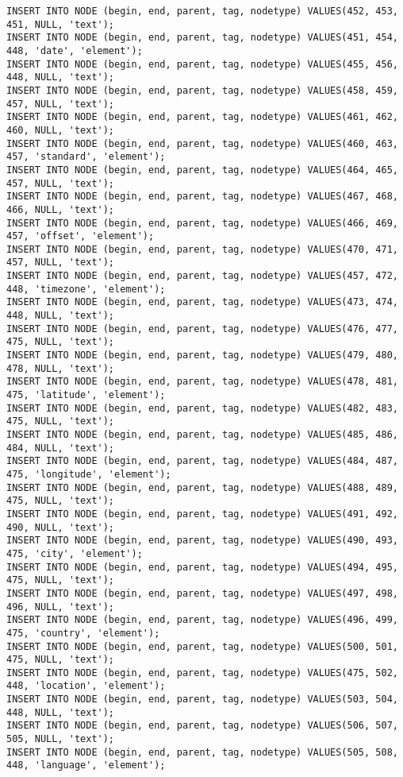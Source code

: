 \begin{verbatim}
INSERT INTO NODE (begin, end, parent, tag, nodetype) VALUES(452, 453, 451, NULL, 'text');
INSERT INTO NODE (begin, end, parent, tag, nodetype) VALUES(451, 454, 448, 'date', 'element');
INSERT INTO NODE (begin, end, parent, tag, nodetype) VALUES(455, 456, 448, NULL, 'text');
INSERT INTO NODE (begin, end, parent, tag, nodetype) VALUES(458, 459, 457, NULL, 'text');
INSERT INTO NODE (begin, end, parent, tag, nodetype) VALUES(461, 462, 460, NULL, 'text');
INSERT INTO NODE (begin, end, parent, tag, nodetype) VALUES(460, 463, 457, 'standard', 'element');
INSERT INTO NODE (begin, end, parent, tag, nodetype) VALUES(464, 465, 457, NULL, 'text');
INSERT INTO NODE (begin, end, parent, tag, nodetype) VALUES(467, 468, 466, NULL, 'text');
INSERT INTO NODE (begin, end, parent, tag, nodetype) VALUES(466, 469, 457, 'offset', 'element');
INSERT INTO NODE (begin, end, parent, tag, nodetype) VALUES(470, 471, 457, NULL, 'text');
INSERT INTO NODE (begin, end, parent, tag, nodetype) VALUES(457, 472, 448, 'timezone', 'element');
INSERT INTO NODE (begin, end, parent, tag, nodetype) VALUES(473, 474, 448, NULL, 'text');
INSERT INTO NODE (begin, end, parent, tag, nodetype) VALUES(476, 477, 475, NULL, 'text');
INSERT INTO NODE (begin, end, parent, tag, nodetype) VALUES(479, 480, 478, NULL, 'text');
INSERT INTO NODE (begin, end, parent, tag, nodetype) VALUES(478, 481, 475, 'latitude', 'element');
INSERT INTO NODE (begin, end, parent, tag, nodetype) VALUES(482, 483, 475, NULL, 'text');
INSERT INTO NODE (begin, end, parent, tag, nodetype) VALUES(485, 486, 484, NULL, 'text');
INSERT INTO NODE (begin, end, parent, tag, nodetype) VALUES(484, 487, 475, 'longitude', 'element');
INSERT INTO NODE (begin, end, parent, tag, nodetype) VALUES(488, 489, 475, NULL, 'text');
INSERT INTO NODE (begin, end, parent, tag, nodetype) VALUES(491, 492, 490, NULL, 'text');
INSERT INTO NODE (begin, end, parent, tag, nodetype) VALUES(490, 493, 475, 'city', 'element');
INSERT INTO NODE (begin, end, parent, tag, nodetype) VALUES(494, 495, 475, NULL, 'text');
INSERT INTO NODE (begin, end, parent, tag, nodetype) VALUES(497, 498, 496, NULL, 'text');
INSERT INTO NODE (begin, end, parent, tag, nodetype) VALUES(496, 499, 475, 'country', 'element');
INSERT INTO NODE (begin, end, parent, tag, nodetype) VALUES(500, 501, 475, NULL, 'text');
INSERT INTO NODE (begin, end, parent, tag, nodetype) VALUES(475, 502, 448, 'location', 'element');
INSERT INTO NODE (begin, end, parent, tag, nodetype) VALUES(503, 504, 448, NULL, 'text');
INSERT INTO NODE (begin, end, parent, tag, nodetype) VALUES(506, 507, 505, NULL, 'text');
INSERT INTO NODE (begin, end, parent, tag, nodetype) VALUES(505, 508, 448, 'language', 'element');

\end{verbatim}
